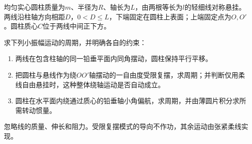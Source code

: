 \documentclass[UTF8,fontset=fandol,a4paper,11pt]{ctexart}
\begin{document}
均匀实心圆柱质量为$m$、半径为$R$、轴长为$L$，由两根等长为$l$的轻细线对称悬挂。两线沿柱轴方向相距$D$，$0<D\le L$，下端固定在圆柱上表面；上端固定点为$O,O'$。圆柱质心$C$位于两线中间正下方。

求下列小振幅运动的周期，并明确各自的约束：
\begin{enumerate}
\item 两线在包含柱轴的同一铅垂平面内同角摆动，圆柱保持平行平移。
\item 把圆柱与悬线作为绕$OO'$轴摆动的一自由度受限复摆，求周期；并判断仅用柔线自由悬挂时，这种整体绕轴运动是否自动成立。
\item 圆柱在水平面内绕通过质心的铅垂轴小角偏航，求周期，并由薄圆片积分求所需转动惯量。
\end{enumerate}
忽略线的质量、伸长和阻力。受限复摆模式的导向不作功，其余运动由张紧柔线实现。
\end{document}

